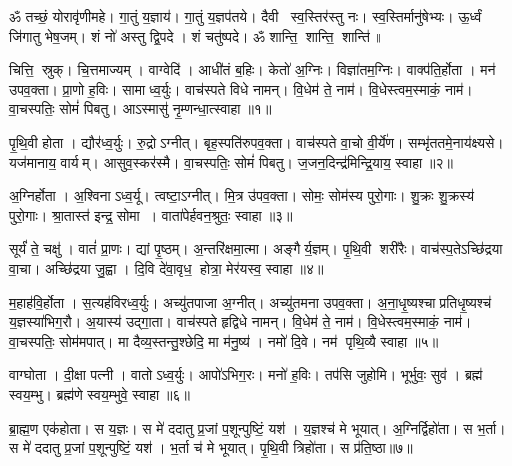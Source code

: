 \setcounter{anuvakam}{0}
ॐ तच्छं॒ योरावृ॑णीमहे। गा॒तुं य॒ज्ञाय॑। गा॒तुं य॒ज्ञप॑तये। 
दैवी स्व॒स्तिर॑स्तु नः। स्व॒स्तिर्मानु॑षेभ्यः। ऊ॒र्ध्वं जि॑गातु भेष॒जम्। 
शं नो॑ अस्तु द्वि॒पदे। शं चतु॑ष्पदे। ॐ शान्ति॒ शान्ति॒ शान्ति॑॥

चित्ति॒ स्रुक्। चि॒त्तमाज्यम्। वाग्वेदि॑। आधी॑तं ब॒\ar{}हिः। केतो॑ अ॒ग्निः। विज्ञा॑तम॒ग्निः। वाक्प॑ति॒र्\mbox{}होता। मन॑ उपव॒क्ता। प्रा॒णो ह॒विः। सामाध्व॒र्युः। वाच॑स्पते विधे नामन्। वि॒धेम॑ ते॒ नाम॑। वि॒धेस्त्वम॒स्माकं॒ नाम॑। वा॒चस्पतिः॒ सोमं॑ पिबतु। आऽस्मासु॑ नृ॒म्णन्धा॒त्स्वाहा॥१॥
\anuvakamend[अ॒ध्व॒र्युः पञ्च॑ च]

पृ॒थि॒वी होता। द्यौर॑ध्व॒र्युः। रु॒द्रोऽग्नीत्। बृह॒स्पति॑रुपव॒क्ता। वाच॑स्पते वा॒चो वी॒र्ये॑ण। सम्भृ॑ततमे॒नाय॑क्ष्यसे। यज॑मानाय॒ वार्यम्। आसुव॒स्कर॑स्मै। वा॒चस्पतिः॒ सोमं॑ पिबतु। ज॒जन॒दिन्द्र॑\-मिन्द्रि॒याय॒ स्वाहा॥२॥%
\anuvakamend[पृ॒थि॒वी होता॒ दश॑]

अ॒ग्निर्\mbox{}होता। अ॒श्विनाऽध्व॒र्यू। त्वष्टा॒ऽग्नीत्। मि॒त्र उ॑पव॒क्ता। सोमः॒ सोम॑स्य पुरो॒गाः। शु॒क्रः  शु॒क्रस्य॑ पुरो॒गाः। श्रा॒तास्त॑ इन्द्र॒ सोमा। वाता॑पेर्\mbox{}हवन॒श्रुतः॒ स्वाहा॥३॥%
\anuvakamend[अ॒ग्निर्होता॒ऽष्टौ]

सूर्यं॑ ते॒ चक्षु॑। वातं॑ प्रा॒णः। द्यां पृ॒ष्ठम्। अ॒न्तरि॑क्षमा॒त्मा। अङ्गैर्\mbox{}य॒ज्ञम्। पृ॒थि॒वी शरी॑रैः। वाच॑स्प॒तेऽच्छि॑द्रया वा॒चा। अच्छि॑द्रया जु॒ह्वा। दि॒वि दे॑वा॒वृध॒ होत्रा॒ मेर॑यस्व॒ स्वाहा॥४॥
\anuvakamend[सूर्यं॑ ते॒ नव॑]

म॒हाह॑वि॒र्\mbox{}होता। स॒त्यह॑विरध्व॒र्युः। अच्यु॑तपाजा अ॒ग्नीत्। अच्यु॑तमना उपव॒क्ता। अ॒ना॒धृ॒ष्यश्चाप्रतिधृ॒ष्यश्च॑ य॒ज्ञस्या॑भिग॒रौ। अ॒यास्य॑ उद्गा॒ता। वाच॑स्पते हृद्विधे नामन्। वि॒धेम॑ ते॒ नाम॑। वि॒धेस्त्वम॒स्माकं॒ नाम॑। वा॒चस्पतिः॒ सोम॑मपात्। मा दैव्य॒स्तन्तु॒श्छेदि॒ मा म॑नु॒ष्य॑। नमो॑ दि॒वे। नम॑ पृथि॒व्यै स्वाहा॥५॥%
\anuvakamend[अ॒पा॒त्त्रीणि॑ च]

वाग्घोता। दी॒क्षा पत्नी। वातोऽध्व॒र्युः। आपो॑ऽभिग॒रः। मनो॑ ह॒विः। तप॑सि जुहोमि। भूर्भुवः॒ सुव॑। ब्रह्म॑ स्वय॒म्भु। ब्रह्म॑णे स्वय॒म्भुवे॒ स्वाहा॥६॥
\anuvakamend[वाग्घोता॒ नव॑]

ब्रा॒ह्म॒ण एक॑होता। स य॒ज्ञः। स मे॑ ददातु प्र॒जां प॒शून्पुष्टिं॒ यश॑। य॒ज्ञश्च॑ मे भूयात्। अ॒ग्निर्द्विहो॑ता। स भ॒र्ता। स मे॑ ददातु प्र॒जां प॒शून्पुष्टिं॒ यश॑। भ॒र्ता च॑ मे भूयात्। पृ॒थि॒वी त्रिहो॑ता। स प्र॑ति॒ष्ठा॥७॥

